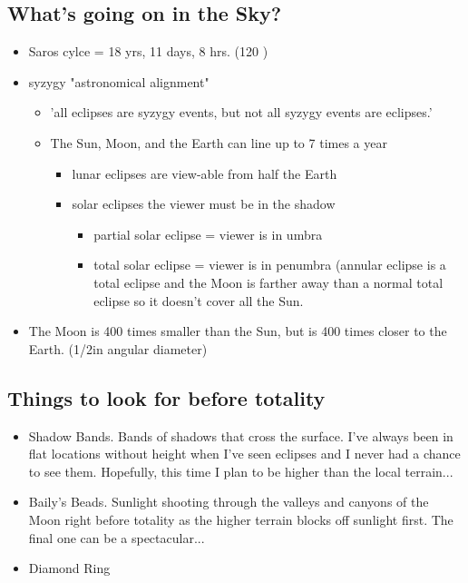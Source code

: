\documentclass{article}
\begin{document}
\subsection{What's going on in the Sky?}
\begin{itemize}
\item Saros cylce = 18 yrs, 11 days, 8 hrs.  (120 \degree)
\item syzygy  "astronomical alignment"
	\begin{itemize}
\item 'all eclipses are syzygy events, but not all syzygy events are eclipses.'
\item The Sun, Moon, and the Earth can line up to 7 times a year
		\begin{itemize}
		\item lunar eclipses are view-able from half the Earth
		\item solar eclipses the viewer must be in the shadow
			\begin{itemize}
			\item partial solar eclipse = viewer is in umbra
			\item total solar eclipse = viewer is in penumbra
			(annular eclipse is a total eclipse and the Moon is farther away than a normal total eclipse so it doesn't cover all the Sun.
			\end{itemize}
		\end{itemize}
	\end{itemize}
\item The Moon is 400 times smaller than the Sun, but is 400 times closer to the Earth. (1/2\degree in angular diameter)
\end{itemize}

\subsection{Things to look for before totality}
\begin{itemize}
\item Shadow Bands.  Bands of shadows that cross the surface.  I've always been in flat locations without height when I've seen eclipses and I never had a chance to see them.  Hopefully, this time I plan to be higher than the local terrain...
\item Baily's Beads.  Sunlight shooting through the valleys and canyons of the Moon right before totality as the higher terrain blocks off sunlight first.  The final one can be a spectacular...
\item Diamond Ring
\end{itemize}

\end{document}
